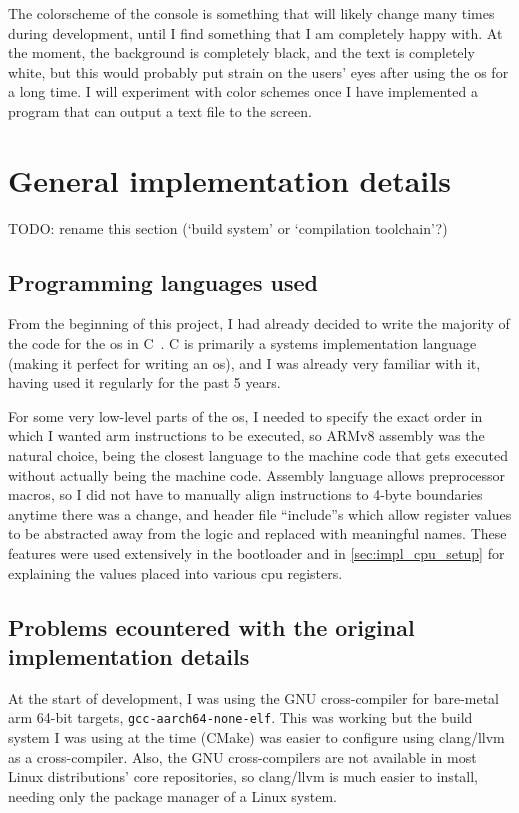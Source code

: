 \documentclass{article}
\begin{document}
The colorscheme of the console is something that will likely change many times
during development, until I find something that I am completely happy with. At
the moment, the background is completely black, and the text is completely
white, but this would probably put strain on the users' eyes after using the
\gls{os} for a long time. I will experiment with color schemes once I have
implemented a program that can output a text file to the screen.


\section{General implementation details}
TODO: rename this section (`build system' or `compilation toolchain'?)
\subsection{Programming languages used}
From the beginning of this project, I had already decided to write the majority
of the code for the \gls{os} in C~\cite{c-programming-language}. C is primarily
a systems implementation language (making it perfect for writing an \gls{os}),
and I was already very familiar with it, having used it regularly for the past
5 years.

For some very low-level parts of the \gls{os}, I needed to specify the exact
order in which I wanted \gls{arm} instructions to be executed, so ARMv8
assembly was the natural choice, being the closest language to the machine code
that gets executed without actually being the machine code. Assembly language
allows preprocessor macros, so I did not have to manually align instructions to
4-byte boundaries anytime there was a change, and header file ``include''s
which allow register values to be abstracted away from the logic and replaced
with meaningful names. These features were used extensively in the bootloader
and in \autoref{sec:impl_cpu_setup} for explaining the values placed into
various \gls{cpu} registers.

\subsection{Problems ecountered with the original implementation details}
At the start of development, I was using the GNU cross-compiler for bare-metal
\gls{arm} 64-bit targets, \texttt{gcc-aarch64-none-elf}. This was working but
the build system I was using at the time (CMake) was easier to configure using
clang/llvm as a cross-compiler. Also, the GNU cross-compilers are not available
in most Linux distributions' core repositories, so clang/llvm is much easier to
install, needing only the package manager of a Linux system.
\end{document}

